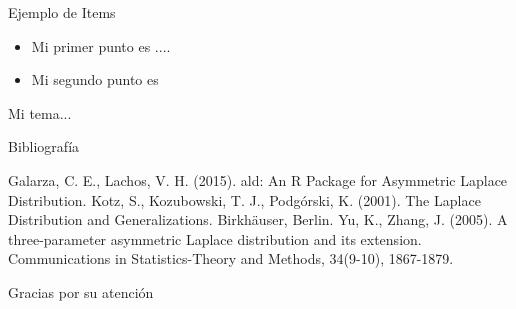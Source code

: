 \documentclass[xcolor=dvipsnames]{beamer}
\begin{document}
\begin{frame}{Ejemplo de Items}


\begin{itemize}
\item Mi primer punto es ....
\item Mi segundo punto es
\end{itemize}



\end{frame}
\begin{frame}{Mi tema...}





\end{frame}
\begin{frame}{Bibliografía}
\begin{thebibliography}{2}

\beamertemplatebookbibitems
{} Galarza, C. E.,  Lachos, V. H. (2015). ald:  An R Package for  Asymmetric Laplace Distribution.
 Kotz, S., Kozubowski, T. J., Podgórski, K. (2001). The Laplace Distribution and Generalizations. Birkhäuser, Berlin.
 Yu, K.,  Zhang, J. (2005). A three-parameter asymmetric Laplace distribution and its extension. Communications in Statistics-Theory and Methods, 34(9-10), 1867-1879.
\end{thebibliography}
\end{frame}
\begin{frame}

\begin{center}
    \huge{Gracias por su atención}
\end{center}


\end{frame}
\end{document}
